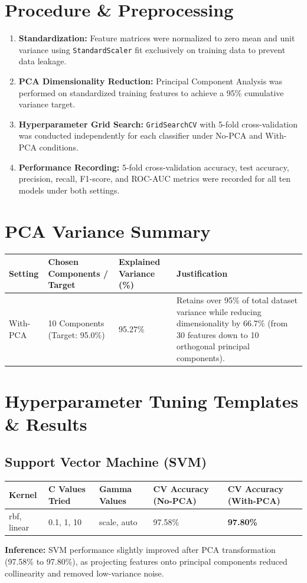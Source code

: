 \documentclass[12pt,a4paper]{article}
\begin{document}
\section{Procedure \& Preprocessing}
\begin{enumerate}
\item \textbf{Standardization:} Feature matrices were normalized to zero mean and unit variance using \texttt{StandardScaler} fit exclusively on training data to prevent data leakage.
\item \textbf{PCA Dimensionality Reduction:} Principal Component Analysis was performed on standardized training features to achieve a 95\% cumulative variance target.
\item \textbf{Hyperparameter Grid Search:} \texttt{GridSearchCV} with 5-fold cross-validation was conducted independently for each classifier under No-PCA and With-PCA conditions.
\item \textbf{Performance Recording:} 5-fold cross-validation accuracy, test accuracy, precision, recall, F1-score, and ROC-AUC metrics were recorded for all ten models under both settings.
\end{enumerate}

\section{PCA Variance Summary}

\begin{longtable}{|p{3cm}|p{3.5cm}|p{3cm}|p{4.5cm}|}
\hline
\textbf{Setting} & \textbf{Chosen Components / Target} & \textbf{Explained Variance (\%)} & \textbf{Justification} \\ \hline
\endhead
With-PCA & 10 Components (Target: 95.0\%) & 95.27\% & Retains over 95\% of total dataset variance while reducing dimensionality by 66.7\% (from 30 features down to 10 orthogonal principal components). \\ \hline
\end{longtable}

\section{Hyperparameter Tuning Templates \& Results}

\subsection*{Support Vector Machine (SVM)}
\begin{longtable}{|p{2.5cm}|p{3cm}|p{3cm}|p{2.8cm}|p{2.8cm}|}
\hline
\textbf{Kernel} & \textbf{C Values Tried} & \textbf{Gamma Values} & \textbf{CV Accuracy (No-PCA)} & \textbf{CV Accuracy (With-PCA)} \\ \hline
\endhead
rbf, linear & 0.1, 1, 10 & scale, auto & 97.58\% & \textbf{97.80\%} \\ \hline
\end{longtable}
\textbf{Inference:} SVM performance slightly improved after PCA transformation (97.58\% to 97.80\%), as projecting features onto principal components reduced collinearity and removed low-variance noise.
\end{document}
